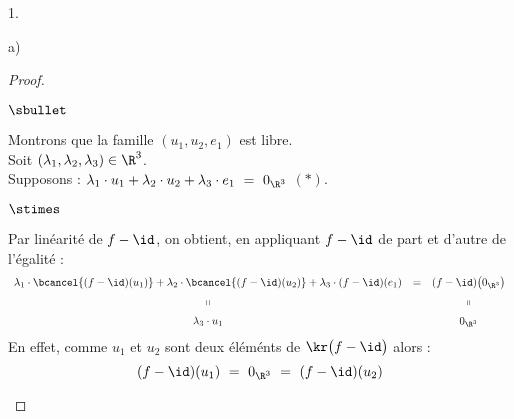 \documentclass[11pt]{article}%
\begin{document}
\begin{noliste}{1.}
\begin{noliste}{a)}
    \begin{proof}~
      \begin{noliste}{$\sbullet$}
      \item Montrons que la famille $(u_1, u_2, e_1)$ est libre.\\
	Soit $(\lambda_1, \lambda_2, \lambda_3) \in \R^3$.\\
        Supposons : $\lambda_1 \cdot u_1 +\lambda_2 \cdot u_2 +
        \lambda_3 \cdot e_1 \ = \ 0_{\R^3}$ $(*)$.
        \begin{noliste}{$\stimes$}
        \item Par linéarité de $f-\id$, on obtient, en appliquant
          $f-\id$ de part et d'autre de l'égalité :
          \[
          \begin{array}{ccc}
            \lambda_1 \cdot \bcancel{(f-\id)(u_1)} + \lambda_2 \cdot
            \bcancel{(f-\id)(u_2)} + \lambda_3 \cdot (f-\id)(e_1) & =
            & (f-\id)\big( 0_{\R^3} \big) 
            \\[.2cm]
            \shortparallel & & \shortparallel
            \\[.2cm]
            \lambda_3 \cdot u_1 & & 0_{\R^3}
          \end{array}
          \]
          En effet, comme $u_1$ et $u_2$ sont deux éléménts de
          $\kr\big( f-\id \big)$ alors : 
          \[
          (f-\id)(u_1) \ = \ 0_{\R^3} \ = \ (f-\id)(u_2)
          \]


\end{noliste}
\end{noliste}
\end{proof}
\end{noliste}
\end{noliste}
\end{document}
